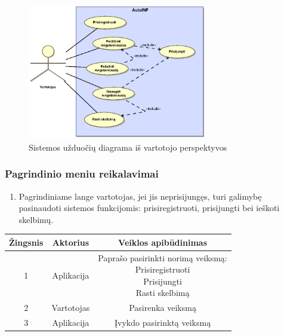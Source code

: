 \documentclass[12pt]{article}
\begin{document}
	\begin{figure}[h]
		\begin{center}
			\includegraphics[width=0.7\textwidth]{TikslaiVartotojas.eps}
			\caption{Sistemos užduočių diagrama iš vartotojo perspektyvos\label{UseCaseUser}}
		\end{center}
	\end{figure}
	\pagebreak
	
	\subsubsection{Pagrindinio meniu reikalavimai}
	\begin{enumerate}[labelindent=10pt,leftmargin=2.2cm]
		\item Pagrindiniame lange vartotojas, jei jis neprisijungęs, turi galimybę pasinaudoti sistemos funkcijomis: prisiregistruoti, prisijungti bei ieškoti skelbimų.
	\end{enumerate}
		
		\begin{center}
		\begin{tabular}{ | c | c | c | }
			\hline
			Žingsnis & Aktorius   & Veiklos apibūdinimas \\ \hline
			1        & Aplikacija & \makecell{Paprašo pasirinkti norimą veiksmą: \\ Prisiregistruoti \\ Prisijungti \\ Rasti skelbimą} \\ \hline
			2        & Vartotojas & Pasirenka veiksmą \\ \hline
			3        & Aplikacija & Įvykdo pasirinktą veiksmą \\ \hline
		\end{tabular}
		\bigskip
		\end{center}
		
\end{document}
